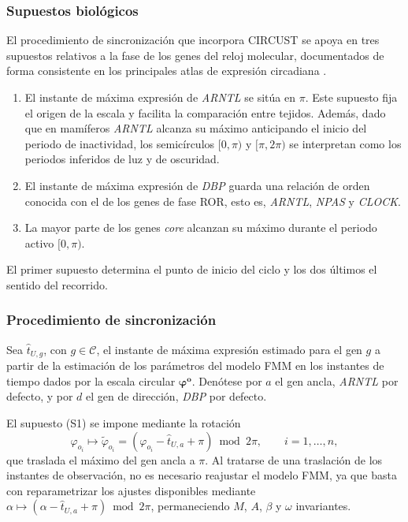\documentclass[12pt, a4paper]{report}
\begin{document}
\subsubsection*{Supuestos biológicos}

El procedimiento de sincronización que incorpora CIRCUST se apoya en tres supuestos relativos a la fase de los genes del reloj molecular, documentados de forma consistente en los principales atlas de expresión circadiana \citep{takahashi2017, zhang2014, mure2018}.

\begin{enumerate}[label=(S\arabic*), leftmargin=*]
\item El instante de máxima expresión de \textit{ARNTL} se sitúa en \(\pi\). Este supuesto fija el origen de la escala y facilita la comparación entre tejidos. Además, dado que en mamíferos \textit{ARNTL} alcanza su máximo anticipando el inicio del periodo de inactividad, los semicírculos \([0,\pi)\) y \([\pi,2\pi)\) se interpretan como los periodos inferidos de luz y de oscuridad.
\item El instante de máxima expresión de \textit{DBP} guarda una relación de orden conocida con el de los genes de fase ROR, esto es, \textit{ARNTL}, \textit{NPAS} y \textit{CLOCK}.
\item La mayor parte de los genes \textit{core} alcanzan su máximo durante el periodo activo \([0,\pi)\).
\end{enumerate}

El primer supuesto determina el punto de inicio del ciclo y los dos últimos el sentido del recorrido.

\subsubsection*{Procedimiento de sincronización}

Sea \(\widehat{t}_{U,g}\), con \(g\in\mathcal{C}\), el instante de máxima expresión estimado para el gen \(g\) a partir de la estimación de los parámetros del modelo FMM en los instantes de tiempo dados por la escala circular \(\boldsymbol{\varphi}^{\mathbf{o}}\). Denótese por \(a\) el gen ancla, \textit{ARNTL} por defecto, y por \(d\) el gen de dirección, \textit{DBP} por defecto.

El supuesto (S1) se impone mediante la rotación
\[
\varphi_{o_i}\longmapsto\widetilde{\varphi}_{o_i}=\left(\varphi_{o_i}-\widehat{t}_{U,a}+\pi\right)\bmod 2\pi,
\qquad i=1,\ldots,n,
\]
que traslada el máximo del gen ancla a \(\pi\). Al tratarse de una traslación de los instantes de observación, no es necesario reajustar el modelo FMM, ya que basta con reparametrizar los ajustes disponibles mediante
\(\alpha\mapsto\left(\alpha-\widehat{t}_{U,a}+\pi\right)\bmod 2\pi\),
permaneciendo \(M\), \(A\), \(\beta\) y \(\omega\) invariantes.
\end{document}
